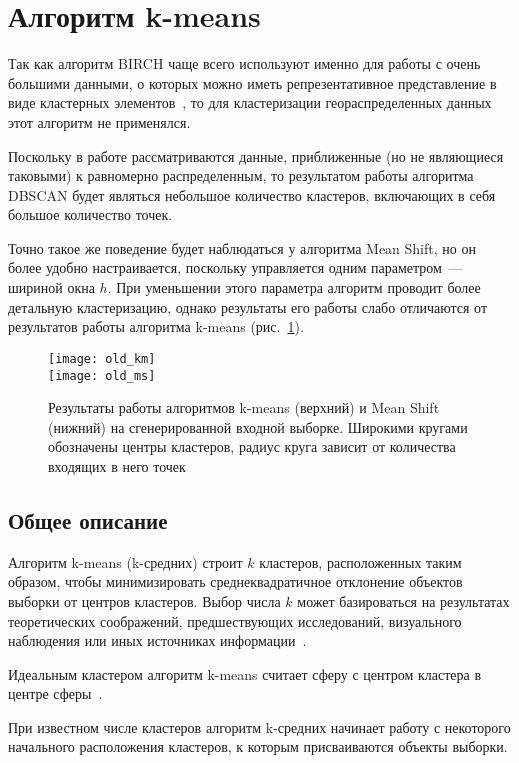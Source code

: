\vspace{-2ex}
\section{Алгоритм k-means} \label{sec:kmeans}
Так как алгоритм BIRCH чаще всего используют именно для работы с очень большими данными, о которых можно иметь репрезентативное представление в виде кластерных элементов~\cite{cod, birch, neiskiy}, то для кластеризации геораспределенных данных этот алгоритм не применялся.

Поскольку в работе рассматриваются данные, приближенные (но не являющиеся таковыми) к равномерно распределенным, то результатом работы алгоритма DBSCAN будет являться небольшое количество кластеров, включающих в себя большое количество точек.

Точно такое же поведение будет наблюдаться у алгоритма Mean Shift, но он более удобно настраивается, поскольку управляется одним параметром~--- шириной окна \( h \). При уменьшении этого параметра алгоритм проводит более детальную кластеризацию, однако результаты его работы слабо отличаются от результатов работы алгоритма k-means (рис.~\ref{pic:oldkm-ms}).
\begin{figure}[t!]
    \centering
    \texttt{[image: old\_km]}\\[.5ex]
    \texttt{[image: old\_ms]}\\[1ex]
    \parbox{.9\textwidth}{\caption{Результаты работы алгоритмов k-means (верхний) и Mean Shift (нижний) на сгенерированной входной выборке. Широкими кругами обозначены центры кластеров, радиус круга зависит от количества входящих в него точек}\label{pic:oldkm-ms}}
\end{figure}

\subsection{Общее описание}
Алгоритм k-means (k-средних) строит \( k \) кластеров, расположенных таким образом, чтобы минимизировать среднеквадратичное отклонение объектов выборки от центров кластеров. Выбор числа \( k \) может базироваться на результатах теоретических соображений, предшествующих исследований, визуального наблюдения или иных источниках информации~\cite{neiskiy}.

Идеальным кластером алгоритм k-means считает сферу с центром кластера в центре сферы~\cite{dbscan-pos}.

При известном числе кластеров алгоритм k-средних начинает работу с некоторого начального расположения кластеров, к которым присваиваются объекты выборки.


